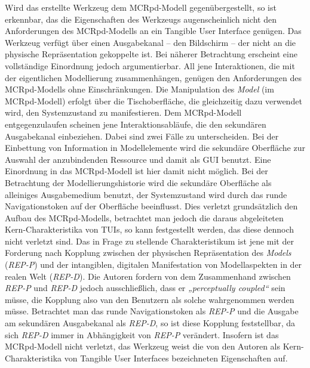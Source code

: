 Wird das erstellte Werkzeug dem \gls{MCRpd}-Modell gegenübergestellt, so ist erkennbar, das die Eigenschaften des Werkzeugs augenscheinlich nicht den Anforderungen des \gls{MCRpd}-Modells an ein Tangible User Interface genügen. Das Werkzeug verfügt über einen Ausgabekanal -- den Bildschirm -- der nicht an die physische Repräsentation gekoppelte ist. Bei näherer Betrachtung erscheint eine vollständige Einordnung jedoch argumentierbar. All jene Interaktionen, die mit der eigentlichen Modellierung zusammenhängen, genügen den Anforderungen des \gls{MCRpd}-Modells ohne Einschränkungen. Die Manipulation des \emph{Model} (im \gls{MCRpd}-Modell) erfolgt über die Tischoberfläche, die gleichzeitig dazu verwendet wird, den Systemzustand zu manifestieren. Dem \gls{MCRpd}-Modell entgegenzulaufen scheinen jene Interaktionsabläufe, die den sekundären Ausgabekanal einbeziehen. Dabei sind zwei Fälle zu unterscheiden. Bei der Einbettung von Information in Modellelemente wird die sekundäre Oberfläche zur Auswahl der anzubindenden Ressource und damit als \gls{GUI} benutzt. Eine Einordnung in das \gls{MCRpd}-Modell ist hier damit nicht möglich. Bei der Betrachtung der Modellierungshistorie wird die sekundäre Oberfläche als alleiniges Ausgabemedium benutzt, der Systemzustand wird durch das runde Navigationstoken auf der Oberfläche beeinflusst. Dies verletzt grundsätzlich den Aufbau des MCRpd-Modells, betrachtet man jedoch die daraus abgeleiteten Kern-Charakteristika von \glspl{TUI}, so kann festgestellt werden, das diese dennoch nicht verletzt sind. Das in Frage zu stellende Charakteristikum ist jene mit der Forderung nach Kopplung zwischen der physischen Repräsentation des \emph{Models} (\emph{REP-P}) und der intangiblen, digitalen Manifestation von Modellaspekten in der realen Welt (\emph{REP-D}). Die Autoren        fordern von dem Zusammenhand zwischen \emph{REP-P} und \emph{REP-D} jedoch ausschließlich, dass er \emph{„perceptually coupled“} sein müsse, die Kopplung also van den Benutzern als solche wahrgenommen werden müsse. Betrachtet man das runde Navigationstoken als \emph{REP-P} und die Ausgabe am sekundären Ausgabekanal als \emph{REP-D}, so ist diese Kopplung feststellbar, da sich \emph{REP-D} immer in Abhängigkeit von \emph{REP-P} verändert. Insofern ist das \gls{MCRpd}-Modell nicht verletzt, das Werkzeug weist die von den Autoren als Kern-Charakteristika von Tangible User Interfaces bezeichneten Eigenschaften auf.


